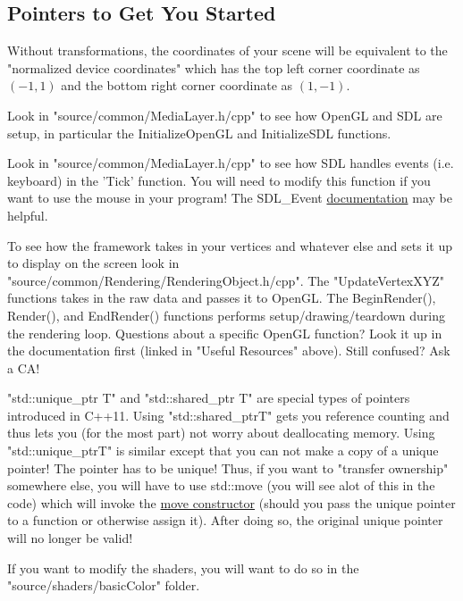 \documentclass{article}
\begin{document}
\subsection*{Pointers to Get You Started}
\begin{itemize*}
\item Without transformations, the coordinates of your scene will be equivalent to the "normalized device coordinates" which has the top left corner coordinate as $(-1, 1)$ and the bottom right corner coordinate as $(1, -1)$.
\item Look in "source/common/MediaLayer.h/cpp" to see how OpenGL and SDL are setup, in particular the InitializeOpenGL and InitializeSDL functions.
\item Look in "source/common/MediaLayer.h/cpp" to see how SDL handles events (i.e. keyboard) in the 'Tick' function. You will need to modify this function if you want to use the mouse in your program! The SDL\_Event \href{https://wiki.libsdl.org/SDL_Event}{documentation} may be helpful.
\item To see how the framework takes in your vertices and whatever else and sets it up to display on the screen look in "source/common/Rendering/RenderingObject.h/cpp". The "UpdateVertexXYZ" functions takes in the raw data and passes it to OpenGL. The BeginRender(), Render(), and EndRender() functions performs setup/drawing/teardown during the rendering loop. Questions about a specific OpenGL function? Look it up in the documentation first (linked in "Useful Resources" above). Still confused? Ask a CA!
\item "std::unique\_ptr \textlangle T\textrangle" and "std::shared\_ptr \textlangle T\textrangle" are special types of pointers introduced in C++11. Using "std::shared\_ptr\textlangle T\textrangle" gets you reference counting and thus lets you (for the most part) not worry about deallocating memory. Using "std::unique\_ptr\textlangle T\textrangle" is similar except that you can not make a copy of a unique pointer! The pointer has to be unique! Thus, if you want to "transfer ownership" somewhere else, you will have to use std::move (you will see alot of this in the code) which will invoke the \href{http://en.cppreference.com/w/cpp/language/move_constructor}{move constructor} (should you pass the unique pointer to a function or otherwise assign it). After doing so, the original unique pointer will no longer be valid!
\item If you want to modify the shaders, you will want to do so in the "source/shaders/basicColor" folder. 
\end{itemize*}
\end{document}
